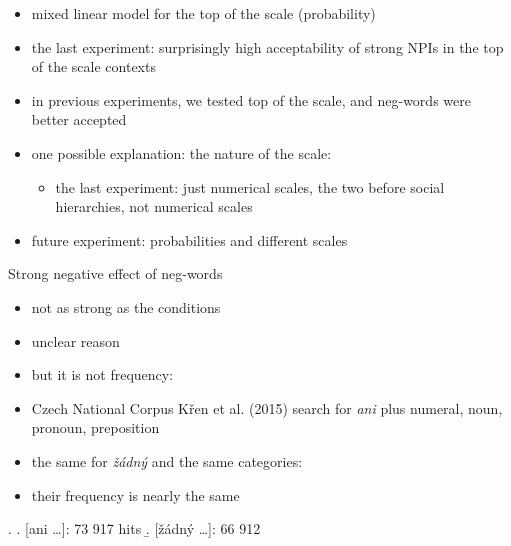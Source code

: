 \documentclass[
  ignorenonframetext,
]{beamer}
\providecommand{\tightlist}{%
  \setlength{\itemsep}{0pt}\setlength{\parskip}{0pt}}\usepackage{longtable,booktabs,array}
\begin{document}
\begin{frame}
\begin{itemize}
\tightlist
\item
  mixed linear model for the top of the scale (probability)
\end{itemize}

\footnotesize
\end{frame}

\begin{frame}
\begin{itemize}
\tightlist
\item
  the last experiment: surprisingly high acceptability of strong NPIs in
  the top of the scale contexts
\item
  in previous experiments, we tested top of the scale, and neg-words
  were better accepted
\item
  one possible explanation: the nature of the scale:

  \begin{itemize}
  \tightlist
  \item
    the last experiment: just numerical scales, the two before social
    hierarchies, not numerical scales
  \end{itemize}
\item
  future experiment: probabilities and different scales
\end{itemize}
\end{frame}

\begin{frame}
\begin{block}{Strong negative effect of neg-words}
\protect\hypertarget{strong-negative-effect-of-neg-words}{}
\begin{itemize}
\tightlist
\item
  not as strong as the conditions
\item
  unclear reason
\item
  but it is not frequency:
\item
  Czech National Corpus Křen et al. (2015) search for \emph{ani} plus
  numeral, noun, pronoun, preposition
\item
  the same for \emph{žádný} and the same categories: \Next
\item
  their frequency is nearly the same
\end{itemize}

\ex. \a. {[}ani \ldots{]}: 73 917 hits \b. {[}žádný \ldots{]}: 66 912

~
\end{block}
\end{frame}
\end{document}
